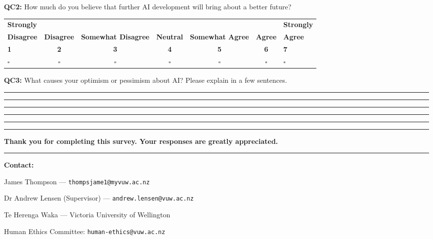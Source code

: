 \documentclass[11pt, a4paper]{article}
\newcommand{\likertseven}{%
  \medskip\noindent
  \footnotesize
  \begin{tabular}{p{1.8cm}c|c|c|c|c|p{1.8cm}}
    \textbf{Strongly} & & & & & & \textbf{Strongly} \\
    \textbf{Disagree} & \textbf{Disagree} & \textbf{Somewhat Disagree} & \textbf{Neutral} & \textbf{Somewhat Agree} & \textbf{Agree} & \textbf{Agree} \\
    \textbf{1} & \textbf{2} & \textbf{3} & \textbf{4} & \textbf{5} & \textbf{6} & \textbf{7} \\
    $\square$ & $\square$ & $\square$ & $\square$ & $\square$ & $\square$ & $\square$
  \end{tabular}
  \normalsize\medskip
}
\newcommand{\questionbox}[2]{%
  \noindent\colorbox{questionbg}{%
    \begin{minipage}{\dimexpr\textwidth-2\fboxsep\relax}
      \textbf{Q#1:} #2
    \end{minipage}}%
  \bigskip
}
\newcommand{\freetext}{%
  \par\noindent\rule{\textwidth}{0.5pt}\par
  \noindent\rule{\textwidth}{0.5pt}\par
  \noindent\rule{\textwidth}{0.5pt}\par
  \noindent\rule{\textwidth}{0.5pt}\par
  \noindent\rule{\textwidth}{0.5pt}\par
  \bigskip
}
\begin{document}
\questionbox{C2}{How much do you believe that further AI development will bring about a better future?}
\likertseven{}

\questionbox{C3}{What causes your optimism or pessimism about AI? Please explain in a few sentences.}
\freetext{}

\vfill
\noindent\textcolor{sectionblue}{\rule{\textwidth}{0.5pt}}
\begin{center}
  \textbf{Thank you for completing this survey. Your responses are greatly appreciated.}
\end{center}
\noindent\textcolor{sectionblue}{\rule{\textwidth}{0.5pt}}

\vspace{0.5em}

\noindent\textbf{Contact:}\par
\noindent James Thompson --- \texttt{thompsjame1@myvuw.ac.nz}\par
\noindent Dr Andrew Lensen (Supervisor) --- \texttt{andrew.lensen@vuw.ac.nz}\par
\noindent Te Herenga Waka --- Victoria University of Wellington\par
\noindent Human Ethics Committee: \texttt{human-ethics@vuw.ac.nz}
\end{document}
